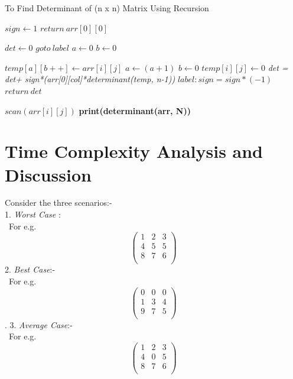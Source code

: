 \documentclass[conference]{IEEEtran}
\begin{document}
\begin{algorithm}
\caption{To Find Determinant of (n x n) Matrix Using Recursion}\label{basic}
\begin{algorithmic}  
\State\textit{$sign\gets1$}
	    	\State\textit{$return \ arr[0][0]$}
            
\Else{}  
		\State\textit{$det\gets0$}
	    	\State\textit{$goto \ label$}
         \EndIf
        \State\textit{$a\gets0$}
        \State\textit{$b\gets0$}
		
	    	\State\textit{$temp[a][b++] \gets arr[i][j]$}
	    		\State\textit{$a\gets(a+1)$}
                \State\textit{$b\gets 0 $}
         	\EndIf
         \Else{}
         	\State\textit{$temp[i][j]\gets0$}
         \EndIf
    \EndFor
    \EndFor
    \State\textit{det = det+ sign*(arr[0][col]*determinant(temp, n-1))}
    \State\textit{$label : sign = sign*(-1)$}
\EndFor
    \EndIf
    \State\textit{$return \  det$}
\EndProcedure


          	\State\textit{$scan( arr[i][j])$}
        \EndFor
        \EndFor
\State\textbf{print(determinant(arr, N))}\\
\EndProcedure
\end{algorithmic}
\end{algorithm}

\section{Time Complexity Analysis and Discussion}
Consider the three scenarios:-\\ 
1. \textit {Worst Case }: \\
\ For e.g. 
$$\begin{pmatrix}
1 & 2 & 3\\
4 & 5 & 5\\
8 & 7 & 6\\
\end{pmatrix}$$
2. \textit {Best Case}:-\\
\ For e.g. 
$$\begin{pmatrix}
0 & 0 & 0\\
1 & 3 & 4\\
9 & 7 & 5\\
\end{pmatrix}$$.
3. \textit{ Average Case}:-\\
\ For e.g. 
$$\begin{pmatrix}
1 & 2 & 3\\
4 & 0 & 5\\
8 & 7 & 6\\
\end{pmatrix}$$
\end{document}
